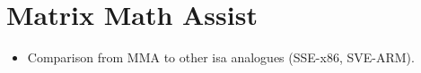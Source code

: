 \documentclass[\main/thesis.tex]{subfiles}
\begin{document}
\chapter{Matrix Math Assist}
\label{cha:mma}

\begin{itemize}
    \item Comparison from MMA to other \gls{isa} analogues (SSE-x86, SVE-ARM).
\end{itemize}
\end{document}
